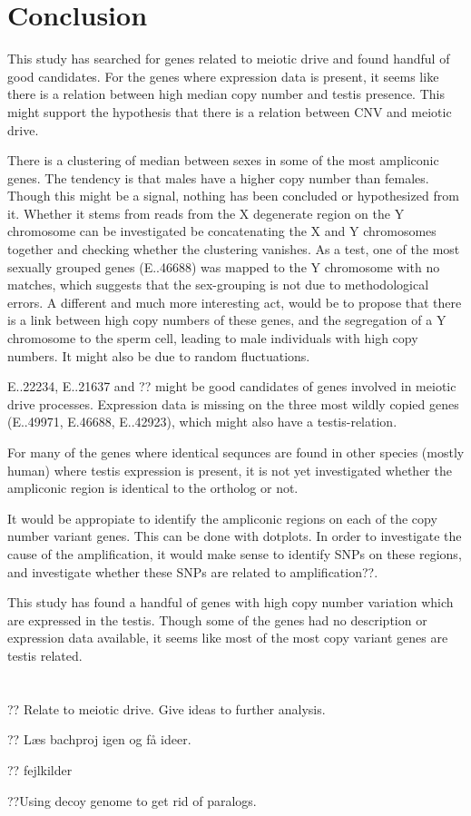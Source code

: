 \section*{Conclusion}

This study has searched for genes related to meiotic drive and found handful of good candidates. For the genes where expression data is present, it seems like there is a relation between high median copy number and testis presence. This might support the hypothesis that there is a relation between CNV and meiotic drive.

There is a clustering of median between sexes in some of the most ampliconic genes. The tendency is that males have a higher copy number than females. Though this might be a signal, nothing has been concluded or hypothesized from it. Whether it stems from reads from the X degenerate region on the Y chromosome can be investigated be concatenating the X and Y chromosomes together and checking whether the clustering vanishes. As a test, one of the most sexually grouped genes (E..46688) was mapped to the Y chromosome with no matches, which suggests that the sex-grouping is not due to methodological errors. A different and much more interesting act, would be to propose that there is a link between high copy numbers of these genes, and the segregation of a Y chromosome to the sperm cell, leading to male individuals with high copy numbers. It might also be due to random fluctuations.

E..22234, E..21637 and ?? might be good candidates of genes involved in meiotic drive processes. Expression data is missing on the three most wildly copied genes (E..49971, E.46688, E..42923), which might also have a testis-relation.

For many of the genes where identical sequnces are found in other species (mostly human) where testis expression is present, it is not yet investigated whether the ampliconic region is identical to the ortholog or not.

It would be appropiate to identify the ampliconic regions on each of the copy number variant genes. This can be done with dotplots. In order to investigate the cause of the amplification, it would make sense to identify SNPs on these regions, and investigate whether these SNPs are related to amplification??.

This study has found a handful of genes with high copy number variation which are expressed in the testis. Though some of the genes had no description or expression data available, it seems like most of the most copy variant genes are testis related.
\\
\\
\\

?? Relate to meiotic drive. Give ideas to further analysis.

?? Læs bachproj igen og få ideer.

?? fejlkilder

??Using decoy genome to get rid of paralogs.


